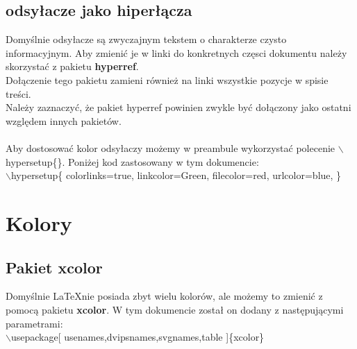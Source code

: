 \documentclass[a4paper, 12pt]{article}
\begin{document}
\subsection{odsyłacze jako hiperłącza}
Domyślnie odsyłacze są zwyczajnym tekstem o charakterze czysto informacyjnym. Aby zmienić je w linki do konkretnych częsci dokumentu należy skorzystać z pakietu \textbf{hyperref}. \\
Dołączenie tego pakietu zamieni również na linki wszystkie pozycje w spisie treści. \\
Należy zaznaczyć, że pakiet hyperref powinien zwykle być dołączony jako ostatni względem innych pakietów. \\
\\
Aby dostosować kolor odsyłaczy możemy w preambule wykorzystać polecenie $\backslash$hypersetup\{\}. Poniżej kod zastosowany w tym dokumencie: \\
$\backslash$hypersetup\{
	colorlinks=true,
	linkcolor=Green,
	filecolor=red,
	urlcolor=blue,
\}

\section{Kolory}
\subsection{Pakiet xcolor}
Domyślnie \LaTeX nie posiada zbyt wielu kolorów, ale możemy to zmienić z pomocą pakietu \textbf{xcolor}. W tym dokumencie został on dodany z następującymi parametrami: \\
$\backslash$usepackage[ usenames,dvipsnames,svgnames,table ]\{xcolor\}
\end{document}
